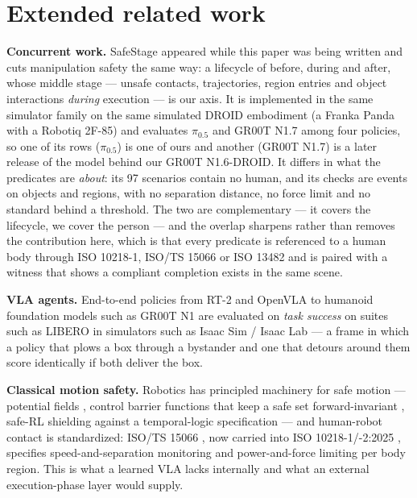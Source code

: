 \section{Extended related work}


\textbf{Concurrent work.} SafeStage \citep{ref61} appeared while this paper was being written and cuts manipulation safety the same way: a lifecycle of before, during and after, whose middle stage --- unsafe contacts, trajectories, region entries and object interactions \emph{during} execution --- is our axis. It is implemented in the same simulator family on the same simulated DROID embodiment (a Franka Panda with a Robotiq 2F-85) and evaluates $\pi_{0.5}$ and GR00T N1.7 among four policies, so one of its rows ($\pi_{0.5}$) is one of ours and another (GR00T N1.7) is a later release of the model behind our GR00T N1.6-DROID. It differs in what the predicates are \emph{about}: its 97 scenarios contain no human, and its checks are events on objects and regions, with no separation distance, no force limit and no standard behind a threshold. The two are complementary --- it covers the lifecycle, we cover the person --- and the overlap sharpens rather than removes the contribution here, which is that every predicate is referenced to a human body through ISO 10218-1, ISO/TS 15066 or ISO 13482 and is paired with a witness that shows a compliant completion exists in the same scene.

\textbf{VLA agents.} End-to-end policies from RT-2 \citep{ref3} and OpenVLA \citep{ref4} to humanoid foundation models such as GR00T N1 \citep{ref5} are evaluated on \emph{task success} on suites such as LIBERO \citep{ref6} in simulators such as Isaac Sim / Isaac Lab \citep{ref7,ref14} --- a frame in which a policy that plows a box through a bystander and one that detours around them score identically if both deliver the box.

\textbf{Classical motion safety.} Robotics has principled machinery for safe motion --- potential fields \citep{ref8}, control barrier functions that keep a safe set forward-invariant \citep{ref9}, safe-RL shielding against a temporal-logic specification \citep{ref10} --- and human-robot contact is standardized: ISO/TS 15066 \citep{ref11}, now carried into ISO 10218-1/-2:2025 \citep{ref35,ref36}, specifies speed-and-separation monitoring and power-and-force limiting per body region. This is what a learned VLA lacks internally and what an external execution-phase layer would supply.


